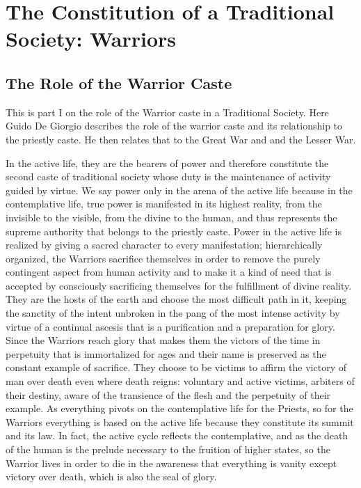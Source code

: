 \section{The Constitution of a Traditional Society: Warriors}

\subsection*{The Role of the Warrior Caste}

\begin{quotex}
This is part I on the role of the Warrior caste in a Traditional Society. Here Guido De Giorgio describes the role of the warrior caste and its relationship to the priestly caste. He then relates that to the Great War and and the Lesser War.
\end{quotex}


In the active life, they are the bearers of power and therefore constitute the second caste of traditional society whose duty is the maintenance of activity guided by virtue. We say power only in the arena of the active life because in the contemplative life, true power is manifested in its highest reality, from the invisible to the visible, from the divine to the human, and thus represents the supreme authority that belongs to the priestly caste. Power in the active life is realized by giving a sacred character to every manifestation; hierarchically organized, the Warriors sacrifice themselves in order to remove the purely contingent aspect from human activity and to make it a kind of need that is accepted by consciously sacrificing themselves for the fulfillment of divine reality. They are the hosts of the earth and choose the most difficult path in it, keeping the sanctity of the intent unbroken in the pang of the most intense activity by virtue of a continual ascesis that is a purification and a preparation for glory. Since the Warriors reach glory that makes them the victors of the time in perpetuity that is immortalized for ages and their name is preserved as the constant example of sacrifice. They choose to be victims to affirm the victory of man over death even where death reigns: voluntary and active victims, arbiters of their destiny, aware of the transience of the flesh and the perpetuity of their example. As everything pivots on the contemplative life for the Priests, so for the Warriors everything is based on the active life because they constitute its summit and its law. In fact, the active cycle reflects the contemplative, and as the death of the human is the prelude necessary to the fruition of higher states, so the Warrior lives in order to die in the awareness that everything is vanity except victory over death, which is also the seal of glory.

